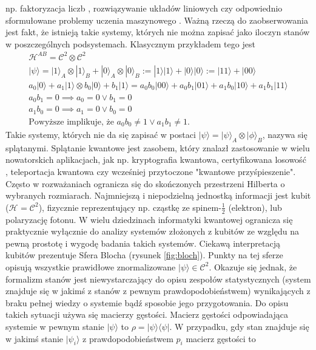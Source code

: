 \documentclass[10pt]{article} %
\newcommand{\Hx}[1]{\mathcal{H}^{#1}}
\newcommand{\Ket}[1]{|#1\rangle}
\newcommand{\Bra}[1]{\langle#1|}
\newcommand{\KP}{\Ket{\psi}}
\newcommand{\BP}{\Bra{\psi}}
\begin{document}
np. faktoryzacja liczb \cite{shor}, rozwiązywanie układów liniowych \cite{soeq} czy odpowiednio sformułowane problemy uczenia maszynowego \cite{qsvm, qpca}.
Ważną rzeczą do zaobserwowania jest fakt, że istnieją takie systemy, których nie można zapisać jako iloczyn stanów w poszczególnych podsystemach. Klasycznym przykładem tego jest
\begin{gather*}
\Hx{AB} = \mathcal{C}^2 \otimes \mathcal{C}^2 \\
\KP = \Ket{1}_A \otimes \Ket{1}_B + \Ket{0}_A \otimes \Ket{0}_B := \Ket{1}\Ket{1} + \Ket{0}\Ket{0} := \Ket{11} + \Ket{00} \\
a_0\Ket{0} + a_1\Ket{1} \otimes b_0\Ket{0} + b_1\Ket{1} = a_0b_0 \Ket{00} + a_0b_1\Ket{01} + a_1b_0\Ket{10} + a_1b_1\Ket{11} \\
a_0b_1 = 0\implies a_0 = 0\vee b_1 = 0 \\
a_1b_0 = 0\implies a_1 = 0\vee b_0 = 0 \\
\text{Powyższe implikuje, że } a_0b_0 \neq 1 \vee a_1b_1 \neq 1.
\end{gather*} Takie systemy, których nie da się zapisać w postaci $\Ket{\psi} = \Ket{\psi}_A \otimes \Ket{\phi}_B$, nazywa się splątanymi. Splątanie kwantowe jest zasobem, który znalazł zastosowanie w wielu nowatorskich aplikacjach, jak np. kryptografia kwantowa\cite{crypto}, certyfikowana losowość \cite{rand}, teleportacja kwantowa\cite{qt} czy wcześniej przytoczone "kwantowe przyśpieszenie".
Często w rozważaniach ogranicza się do skończonych przestrzeni Hilberta o wybranych rozmiarach. Najmniejszą i niepodzielną jednostką informacji jest kubit ($\Hx{} = \mathcal{C}^2$), fizycznie reprezentujący np. cząstkę ze spinem-$\frac{1}{2}$ (elektron), lub polaryzację fotonu. W wielu dziedzinach informatyki kwantowej ogranicza się praktycznie wyłącznie do analizy systemów złożonych z kubitów ze względu
na pewną prostotę i wygodę badania takich systemów. Ciekawą interpretacją kubitów prezentuje Sfera Blocha (rysunek \ref{fig:bloch}). Punkty na tej sferze opisują wszystkie prawidłowe znormalizowane $\KP \in \mathcal{C}^2$.
Okazuje się jednak, że formalizm stanów jest niewystarczający do opisu zespołów statystycznych (system znajduje się w jakimś z stanów z pewnym prawdopodobieństwem) wynikających z braku pełnej wiedzy o systemie bądź sposobie jego przygotowania. Do opisu takich sytuacji używa się macierzy gęstości. 
Macierz gęstości odpowiadająca systemie w pewnym stanie $\KP$ to $\rho = \KP \BP$.
W przypadku, gdy stan znajduje się w jakimś stanie $\Ket{\psi_i}$ z prawdopodobieństwem $p_i$ macierz gęstości to
\end{document}

